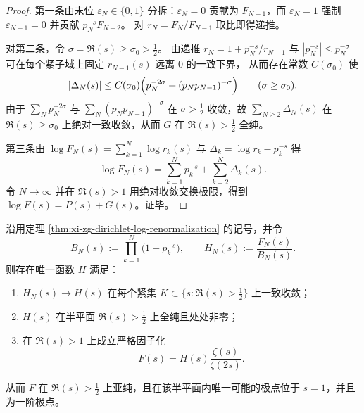 \begin{proof}
第一条由末位 \(\varepsilon_N\in\{0,1\}\) 分拆：\(\varepsilon_N=0\) 贡献为 \(F_{N-1}\)，而 \(\varepsilon_N=1\) 强制 \(\varepsilon_{N-1}=0\) 并贡献 \(p_N^{-s}F_{N-2}\)。
对 \(r_N=F_N/F_{N-1}\) 取比即得递推。
\par
对第二条，令 \(\sigma=\Re(s)\ge \sigma_0>\tfrac12\)。
由递推 \(r_N=1+p_N^{-s}/r_{N-1}\) 与 \(|p_N^{-s}|\le p_N^{-\sigma}\) 可在每个紧子域上固定 \(r_{N-1}(s)\) 远离 \(0\) 的一致下界，
从而存在常数 \(C(\sigma_0)\) 使
\[
|\Delta_N(s)|
\le
C(\sigma_0)\Bigl(p_N^{-2\sigma}+(p_Np_{N-1})^{-\sigma}\Bigr)
\qquad(\sigma\ge\sigma_0).
\]
由于
\(
\sum_N p_N^{-2\sigma}
\)
与
\(
\sum_N(p_Np_{N-1})^{-\sigma}
\)
在 \(\sigma>\tfrac12\) 收敛，故 \(\sum_{N\ge 2}\Delta_N(s)\) 在 \(\Re(s)\ge\sigma_0\) 上绝对一致收敛，从而 \(G\) 在 \(\Re(s)>\tfrac12\) 全纯。
\par
第三条由
\(
\log F_N(s)=\sum_{k=1}^N\log r_k(s)
\)
与 \(\Delta_k=\log r_k-p_k^{-s}\) 得
\[
\log F_N(s)=\sum_{k=1}^{N}p_k^{-s}+\sum_{k=2}^{N}\Delta_k(s).
\]
令 \(N\to\infty\) 并在 \(\Re(s)>1\) 用绝对收敛交换极限，得到 \(\log F(s)=P(s)+G(s)\)。证毕。
\end{proof}

\begin{theorem}\label{thm:xi-zg-zeta-factorization}
沿用定理 \ref{thm:xi-zg-dirichlet-log-renormalization} 的记号，并令
\[
B_N(s):=\prod_{k=1}^{N}\bigl(1+p_k^{-s}\bigr),\qquad
H_N(s):=\frac{F_N(s)}{B_N(s)}.
\]
则存在唯一函数 \(H\) 满足：
\begin{enumerate}
  \item \(H_N(s)\to H(s)\) 在每个紧集 \(K\subset\{s:\Re(s)>\tfrac12\}\) 上一致收敛；
  \item \(H(s)\) 在半平面 \(\Re(s)>\tfrac12\) 上全纯且处处非零；
  \item 在 \(\Re(s)>1\) 上成立严格因子化
  \[
  F(s)=H(s)\frac{\zeta(s)}{\zeta(2s)}.
  \]
\end{enumerate}
从而 \(F\) 在 \(\Re(s)>\tfrac12\) 上亚纯，且在该半平面内唯一可能的极点位于 \(s=1\)，并且为一阶极点。
\end{theorem}

